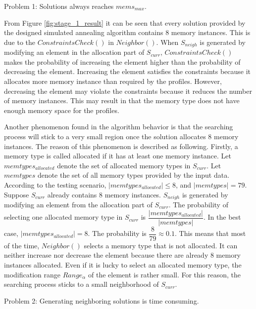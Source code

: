 		Problem 1: Solutions always reaches $mems_{max}$.
		
		From Figure \ref{fig:stage_1_result} it can be seen that
		every solution provided by the designed simulated annealing
		algorithm contains 8 memory instances. This is due
		to the $ConstraintsCheck()$ in $Neighbor()$.
		When $S_{neigh}$ is generated by modifying an element in the allocation
		part of $S_{curr}$, $ConstraintsCheck()$ makes the probability of increasing
		the element higher than the probability of decreasing the element.
		Increasing the element satisfies the constraints because it allocates
		more memory instance than required by the profiles.
		However, decreasing the element may violate the constraints because it reduces
		the number of memory instances. This may result in that the memory type does
		not have enough memory space for the profiles.
		
		Another phenomenon found in
		the algorithm behavior is that the searching process will stick to a very small
		region once the solution allocates 8 memory instances. The reason of this
		phenomenon is described as following. Firstly, a memory type is called allocated
		if it has at least one memory instance. Let $memtypes_{allocated}$ denote the
		set of allocated memory types in $S_{curr}$. Let $memtypes$ denote the set of
		all memory types provided by the input data. According to the testing scenario,
		$\lvert memtypes_{allocated} \rvert \leq 8$, and $\lvert memtypes \rvert = 79$.
		Suppose $S_{curr}$ already contains 8 memory instances. $S_{neigh}$ is generated
		by modifying an element from the allocation part of $S_{curr}$.
		The probability of selecting one allocated memory type in $S_{curr}$ is
		$\dfrac{\lvert memtypes_{allocated} \rvert}{\lvert memtypes \rvert}$.
		In the best case, $\lvert memtypes_{allocated} \rvert = 8$.
		The probability is $\dfrac{8}{79} \approx 0.1$. This means that most of the time,
		$Neighbor()$ selects a memory type that is not allocated. It can neither increase
		nor decrease the element because there are already 8 memory instances allocated.
		Even if it is lucky to select an allocated memory type, the modification range
		$Range_{\alpha}$ of the element is rather small. For this reason, the searching
		process sticks to a small neighborhood of $S_{curr}$.
		
		Problem 2: Generating neighboring solutions is time consuming.
		
